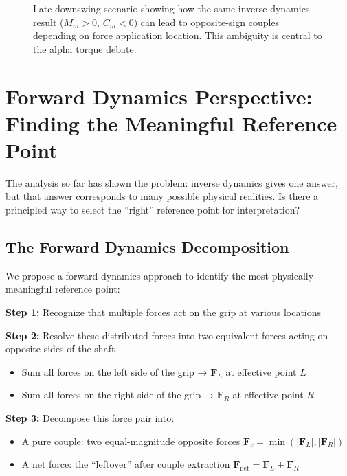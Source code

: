 \documentclass[11pt,a4paper]{article}
\newcommand{\bvec}[1]{\mathbf{#1}}
\begin{document}
\begin{figure}[ht]
\caption{Late downswing scenario showing how the same inverse dynamics result ($M_m > 0$, $C_m < 0$) can lead to opposite-sign couples depending on force application location. This ambiguity is central to the alpha torque debate.}
\label{fig:alpha_debate}
\end{figure}

\section{Forward Dynamics Perspective: Finding the Meaningful Reference Point}

The analysis so far has shown the problem: inverse dynamics gives one answer, but that answer corresponds to many possible physical realities. Is there a principled way to select the ``right'' reference point for interpretation?

\subsection{The Forward Dynamics Decomposition}

We propose a forward dynamics approach to identify the most physically meaningful reference point:

\textbf{Step 1:} Recognize that multiple forces act on the grip at various locations

\textbf{Step 2:} Resolve these distributed forces into two equivalent forces acting on opposite sides of the shaft
\begin{itemize}
    \item Sum all forces on the left side of the grip → $\bvec{F}_L$ at effective point $L$
    \item Sum all forces on the right side of the grip → $\bvec{F}_R$ at effective point $R$
\end{itemize}

\textbf{Step 3:} Decompose this force pair into:
\begin{itemize}
    \item A pure couple: two equal-magnitude opposite forces $\bvec{F}_c = \min(|\bvec{F}_L|, |\bvec{F}_R|)$
    \item A net force: the ``leftover'' after couple extraction $\bvec{F}_{\text{net}} = \bvec{F}_L + \bvec{F}_R$
\end{itemize}
\end{document}
